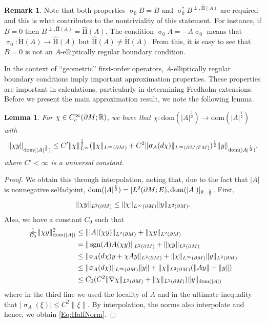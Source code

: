 \documentclass[a4paper,10pt,reqno]{amsart}
\newcommand{\sym}{\upsigma}
\newcommand{\R}{\mathbb{R}}
\newcommand{\modulus}[1]{|#1|}
\newcommand{\norm}[1]{\| #1 \|}%
\newcommand{\Lp}[2][{}]{{\rm L}^{#2}_{\rm #1}}%
\newcommand{\Ck}[2][{}]{{\rm C}^{#2}_{\rm #1}}%
\newcommand{\checkH}{\check{\mathrm{H}}}
\newcommand{\hatH}{\hat{\mathrm{H}}}
\newcommand{\dom}{\mathrm{dom}}
\DeclareMathOperator{\sgn}{sgn}%
\newcommand{\dM}{\partial M}
\newtheorem{lemma}[theorem]{Lemma}
\theoremstyle{definition}
\newtheorem{remark}[theorem]{Remark}
\begin{document}
\begin{remark}
Note that both properties $\sym_0 B = B$ and $\sym_0^\ast B^{\perp, \hatH(A)}$ are required and this is what contributes to the nontriviality of this statement.
For instance, if $B = 0$ then $B^{\perp, \hatH(A)} = \hatH(A)$.
The condition  $\sym_0A = - A \sym_0$ means that $\sym_0: \checkH(A)  \to \hatH(A)$ but $\hatH(A) \neq \checkH(A)$.
From this, it is easy to see that $B = 0$ is not an $A$-elliptically regular boundary condition.
\end{remark}


In the context of ``geometric'' first-order operators, $A$-elliptically regular  boundary conditions imply important approximation properties.
These properties are important in calculations, particularly in determining Fredholm extensions.
Before we present the main approximation result,  we note the following lemma.

\begin{lemma}
\label{Lem:Approx}
For $\chi \in \Ck[c]{\infty}(\dM;\R)$, we have that $\chi:\dom(\modulus{A}^{\frac12}) \to \dom(\modulus{A}^{\frac12})$ with
\begin{equation}
\label{Eq:HalfNorm}
\norm{\chi y}_{\dom(\modulus{A}^{\frac12})} \leq C' \norm{\chi}_{\Lp{\infty}}^{\frac12}(\norm{\chi}_{\Lp{\infty}(\dM)} + C^2 \norm{\sym_{A}(d \chi)}_{\Lp{\infty}(\dM;TM)})^{\frac12} \norm{y}_{\dom(\modulus{A}^{\frac12})},
\end{equation}
where $C' < \infty$ is a universal constant.
\end{lemma}
\begin{proof}
We obtain this through interpolation, noting that, due to the fact that $\modulus{A}$ is nonnegative selfadjoint, $\dom(\modulus{A}^{\frac12}) = [\Lp{2}(\dM;E), \dom(\modulus{A})]_{\theta = \frac12}$.
First,
$$\norm{\chi y}_{\Lp{2}(\dM)} \leq \norm{\chi}_{\Lp{\infty}(\dM)} \norm{y}_{\Lp{2}(\dM)}.$$
Also, we have a constant $C_0$ such that
\begin{align*}
\tfrac{1}{C_0} \norm{\chi y}_{\dom(\modulus{A})}^2
 & \leq \norm{\modulus{A} (\chi y)}_{\Lp{2}(\dM)} + \norm{\chi y}_{\Lp{2}(\dM)}                                    \\
 & = \norm{\sgn(A) A (\chi y)}_{\Lp{2}(\dM)} + \norm{\chi y}_{\Lp{2}(\dM)}                                         \\
 & \leq \norm{ \sym_{A}(d \chi)y  + \chi Ay}_{\Lp{2}(\dM)} + \norm{\chi}_{\Lp{\infty}(\dM)} \norm{y}_{\Lp{2}(\dM)} \\
 & \leq \norm{\sym_{A}(d \chi)}_{\Lp{\infty}(\dM)} \norm{y} + \norm{\chi}_{\Lp{2}(\dM)} (\norm{Ay} + \norm{y})         \\
 & \leq C_0 (C^2 \norm{\nabla \chi}_{\Lp{2}(\dM)} +  \norm{\chi}_{\Lp{2}(\dM)}) \norm{y}_{\dom(\modulus{A})}
\end{align*}
where in the third line we used the locality of $A$ and in the ultimate inequality that $\modulus{\sym_{A}(\xi)} \leq C^2 \norm{\xi}$.
By interpolation, the norms also interpolate and hence, we obtain \eqref{Eq:HalfNorm}.
\end{proof}
\end{document}
